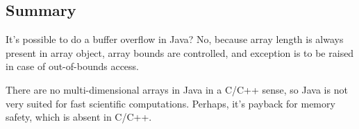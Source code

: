 \subsection{Summary}

It's possible to do a buffer overflow in Java?
No, because array length is always present in array object, 
array bounds are controlled, and exception is to be raised in case of out-of-bounds access.

There are no multi-dimensional arrays in Java in a C/C++ sense, so Java is not very suited
for fast scientific computations. 
Perhaps, it's payback for memory safety, which is absent in C/C++.
